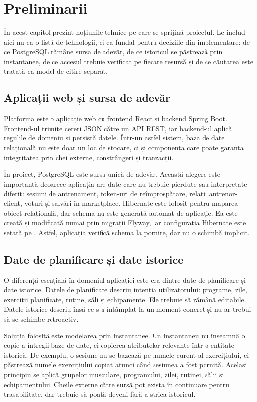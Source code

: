 \chapter{Preliminarii}
\label{cap:preliminarii}

În acest capitol prezint noțiunile tehnice pe care se sprijină proiectul. Le includ aici nu ca o
listă de tehnologii, ci ca fundal pentru deciziile din implementare: de ce PostgreSQL rămâne sursa de
adevăr, de ce istoricul se păstrează prin instantanee, de ce accesul trebuie verificat pe fiecare
resursă și de ce căutarea este tratată ca model de citire separat.

\section{Aplicații web și sursa de adevăr}

Platforma este o aplicație web cu frontend React și backend Spring Boot. Frontend-ul trimite cereri
JSON către un API REST, iar backend-ul aplică regulile de domeniu și persistă datele. Într-un astfel
sistem, baza de date relațională nu este doar un loc de stocare, ci și componenta care poate garanta
integritatea prin chei externe, constrângeri și tranzacții.

În proiect, PostgreSQL este sursa unică de adevăr. Această alegere este importantă deoarece aplicația
are date care nu trebuie pierdute sau interpretate diferit: sesiuni de antrenament, token-uri de
reîmprospătare, relații antrenor-client, voturi și salvări în marketplace. Hibernate este folosit
pentru maparea obiect-relațională, dar schema nu este generată automat de aplicație. Ea este creată și
modificată numai prin migrații Flyway, iar configurația Hibernate este setată pe . Astfel, aplicația verifică schema la pornire, dar nu o schimbă implicit.

\section{Date de planificare și date istorice}

O diferență esențială în domeniul aplicației este cea dintre date de planificare și date istorice.
Datele de planificare descriu intenția utilizatorului: programe, zile, exerciții planificate, rutine,
săli și echipamente. Ele trebuie să rămână editabile. Datele istorice descriu însă ce s-a întâmplat la
un moment concret și nu ar trebui să se schimbe retroactiv.

Soluția folosită este modelarea prin instantanee. Un instantaneu nu înseamnă o copie a întregii baze
de date, ci copierea atributelor relevante într-o entitate istorică. De exemplu, o sesiune nu se
bazează pe numele curent al exercițiului, ci păstrează numele exercițiului copiat atunci când sesiunea
a fost pornită. Același principiu se aplică grupelor musculare, programului, zilei, rutinei, sălii și
echipamentului. Cheile externe către sursă pot exista în continuare pentru trasabilitate, dar trebuie
să poată deveni  fără a strica istoricul.

